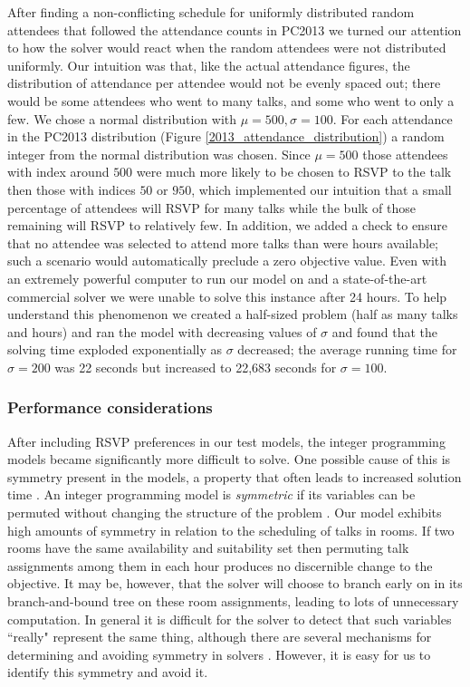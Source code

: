 \documentclass{svjour3}                     %
\begin{document}
After finding a non-conflicting schedule for uniformly distributed random attendees that followed the attendance counts in PC2013 we turned our attention to how the solver would react when the random attendees were not distributed uniformly. 
Our intuition was that, like the actual attendance figures, the distribution of attendance per attendee would not be evenly spaced out; there would be some attendees who went to many talks, and some who went to only a few. 
We chose a normal distribution with $\mu = 500, \sigma = 100$. 
For each attendance in the PC2013 distribution (Figure \ref{2013_attendance_distribution}) a random integer from the normal distribution was chosen. 
Since $\mu = 500$ those attendees with index around $500$ were much more likely to be chosen to RSVP to the talk then those with indices $50$ or $950$, which implemented our intuition that a small percentage of attendees will RSVP for many talks while the bulk of those remaining will RSVP to relatively few.
In addition, we added a check to ensure that no attendee was selected to attend more talks than were hours available; such a scenario would automatically preclude a zero objective value.
Even with an extremely powerful computer to run our model on and a state-of-the-art commercial solver we were unable to solve this instance after 24 hours. 
To help understand this phenomenon we created a half-sized problem (half as many talks and hours) and ran the model with decreasing values of $\sigma$ and found that the solving time exploded exponentially as $\sigma$ decreased; the average running time for $\sigma = 200$ was 22 seconds but increased to 22,683 seconds for $\sigma = 100$.

\subsubsection{Performance considerations}
After including RSVP preferences in our test models, the integer programming models became significantly more difficult to solve.
One possible cause of this is symmetry present in the models, a property that often leads to increased solution time \cite{sherali}.
An integer programming model is \emph{symmetric} if its variables can be permuted without changing the structure of the problem \cite{margot}. 
Our model exhibits high amounts of symmetry in relation to the scheduling of talks in rooms. 
If two rooms have the same availability and suitability set then permuting talk assignments among them in each hour produces no discernible change to the objective. 
It may be, however, that the solver will choose to branch early on in its branch-and-bound tree on these room assignments, leading to lots of unnecessary computation. 
In general it is difficult for the solver to detect that such variables ``really" represent the same thing, although there are several mechanisms for  determining and avoiding symmetry in solvers \cite{ostrowski}. 
However, it is easy for us to identify this symmetry and avoid it.
\end{document}
